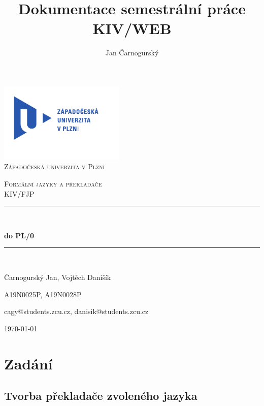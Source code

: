 \documentclass[12pt, a4paper]{article}
\title{\textbf{Dokumentace semestrální práce} \\KIV/WEB}
\author{Jan Čarnogurský}
\begin{document}
\begin{titlepage}
	\newcommand{\HRule}{\rule{\linewidth}{0.3mm}}
	\begin{center}
	\includegraphics[width=6cm]{img/logo}\\
	\textsc{\LARGE Západočeská univerzita v Plzni}\\[1.5cm]
	\end{center}
	\textsc{\Large Formální jazyky a překladače}\\[0.5cm]
	\textsc{\large KIV/FJP}\\[0.5cm]
	\HRule\\[0.2cm]
	\begin{center}
	{\bfseries {} do PL/0}\\[0.5cm]
	\end{center}
	\HRule\\[1.5cm]


	\begin{minipage}{\textwidth}
		\begin{flushleft}
			{\Large Čarnogurský Jan, Vojtěch Danišík\par}
			{\Large A19N0025P, A19N0028P\par}
			{\Large cagy@students.zcu.cz, danisik@students.zcu.cz\par}
		\end{flushleft}
	\end{minipage}
	\vfill\vfill\vfill
	\begin{flushright}
	{\large\today}
	\end{flushright}
	\vfill
\end{titlepage}

\tableofcontents
\thispagestyle{empty}
\clearpage

\newpage
\section{Zadání}
\subsection{Tvorba překladače zvoleného jazyka}
\setcounter{page}{1}
\end{document}
